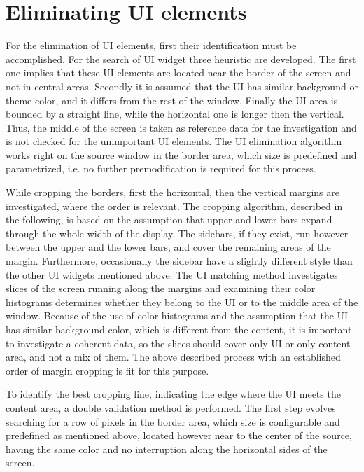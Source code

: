 \documentclass[draft,final]{vutinfth} %
\begin{document}
	\section{Eliminating UI elements}
	For the elimination of UI elements, first their identification must be accomplished. 
	For the search of UI widget three heuristic are developed.
	The first one implies that these UI elements are located near the border of the screen and not in central areas.
	Secondly it is assumed that the UI has similar background or theme color, and it differs from the rest of the window.
	Finally the UI area is bounded by a straight line, while the horizontal one is longer then the vertical.
	Thus, the middle of the screen is taken as reference data for the investigation and is not checked for the unimportant UI elements.
	The UI elimination algorithm works right on the source window in the border area, which size is predefined and parametrized, i.e. no further premodification is required for this process.\par
	While cropping the borders, first the horizontal, then the vertical margins are investigated, where the order is relevant.
	The cropping algorithm, described in the following, is based on the assumption that upper and lower bars expand through the whole width of the display.
	The sidebars, if they exist, run however between the upper and the lower bars, and cover the remaining areas of the margin.
	Furthermore, occasionally the sidebar have a slightly different style than the other UI widgets mentioned above.
	The UI matching method investigates slices of the screen running along the margins and examining their color histograms determines whether they belong to the UI or to the middle area of the window.
	Because of the use of color histograms and the assumption that the UI has similar background color, which is different from the content, it is important to investigate a coherent data, so the slices should cover only UI or only content area, and not a mix of them.
	The above described process with an established order of margin cropping is fit for this purpose. \par 
	To identify the best cropping line, indicating the edge where the UI meets the content area, a double validation method is performed.
	The first step evolves searching for a row of pixels in the border area, which size is configurable and predefined as mentioned above, located however near to the center of the source, having the same color and no interruption along the horizontal sides of the screen.
\end{document}
